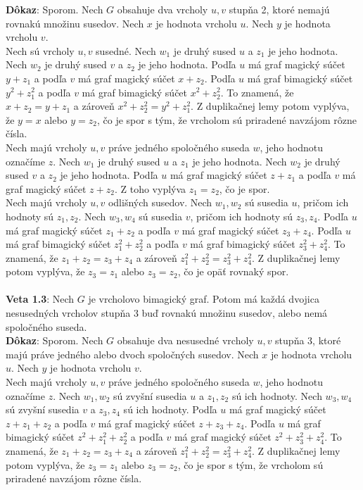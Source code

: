 \documentclass[12pt]{article}
\begin{document}
\textbf{Dôkaz}: Sporom. Nech $G$ obsahuje dva vrcholy $u,v$ stupňa 2, ktoré nemajú rovnakú množinu susedov. Nech $x$ je hodnota vrcholu $u$. Nech $y$ je hodnota vrcholu $v$. \\

Nech sú vrcholy $u,v$ susedné. Nech $w_1$ je druhý sused $u$ a $z_1$ je jeho hodnota. Nech $w_2$ je druhý sused $v$ a $z_2$ je jeho hodnota. Podľa $u$ má graf magický súčet $y + z_1$ a podľa $v$ má graf magický súčet $x + z_2$. Podľa $u$ má graf bimagický súčet $y^2 + z^2_1$ a podľa $v$ má graf bimagický súčet $x^2 + z^2_2$.  To znamená, že $x + z_2 = y + z_1$ a zároveň $x^2 + z^2_2 = y^2 + z^2_1$. Z duplikačnej lemy potom vyplýva, že $y = x$ alebo $y = z_2$, čo je spor s tým, že vrcholom sú priradené navzájom rôzne čísla. \\

Nech majú vrcholy $u,v$ práve jedného spoločného suseda $w$, jeho hodnotu označíme $z$. Nech $w_1$ je druhý sused $u$ a $z_1$ je jeho hodnota. Nech $w_2$ je druhý sused $v$ a $z_2$ je jeho hodnota. Podľa $u$ má graf magický súčet $z + z_1$ a podľa $v$ má graf magický súčet $z + z_2$. Z toho vyplýva $z_1 = z_2$, čo je spor. \\

Nech majú vrcholy $u,v$ odlišných susedov. Nech $w_1, w_2$ sú susedia $u$, pričom ich hodnoty sú $z_1, z_2$. Nech $w_3, w_4$ sú susedia $v$, pričom ich hodnoty sú $z_3, z_4$. Podľa $u$ má graf magický súčet $z_1 + z_2$ a podľa $v$ má graf magický súčet $z_3 + z_4$. Podľa $u$ má graf bimagický súčet $z^2_1 + z^2_2$ a podľa $v$ má graf bimagický súčet $z^2_3 + z^2_4$. To znamená, že $z_1 + z_2 = z_3 + z_4$ a zároveň $z^2_1 + z^2_2 = z^2_3 + z^2_4$. Z duplikačnej lemy potom vyplýva, že $z_3 = z_1$ alebo $z_3 = z_2$, čo je opäť rovnaký spor. \\\\

\textbf{Veta 1.3}: Nech $G$ je vrcholovo bimagický graf. Potom má každá dvojica nesusedných vrcholov stupňa 3 buď rovnakú množinu susedov, alebo nemá spoločného suseda.  \\

\textbf{Dôkaz}: Sporom. Nech $G$ obsahuje dva nesusedné vrcholy $u,v$ stupňa 3, ktoré majú práve jedného alebo dvoch spoločných susedov. Nech $x$ je hodnota vrcholu $u$. Nech $y$ je hodnota vrcholu $v$.  \\

Nech majú vrcholy $u,v$ práve jedného spoločného suseda $w$, jeho hodnotu označíme $z$. Nech $w_1, w_2$ sú zvyšní susedia $u$ a $z_1, z_2$ sú ich hodnoty. Nech $w_3, w_4$ sú zvyšní susedia $v$ a $z_3, z_4$ sú ich hodnoty. Podľa $u$ má graf magický súčet $z + z_1 + z_2$ a podľa $v$ má graf magický súčet $z + z_3 + z_4$. Podľa $u$ má graf bimagický súčet $z^2 + z^2_1 + z^2_2$ a podľa $v$ má graf magický súčet $z^2 + z^2_3 + z^2_4$. To znamená, že $z_1 + z_2 = z_3 + z_4$ a zároveň $z^2_1 + z^2_2 = z^2_3 + z^2_4$. Z duplikačnej lemy potom vyplýva, že $z_3 = z_1$ alebo $z_3 = z_2$, čo je spor s tým, že vrcholom sú priradené navzájom rôzne čísla. \\
\end{document}
